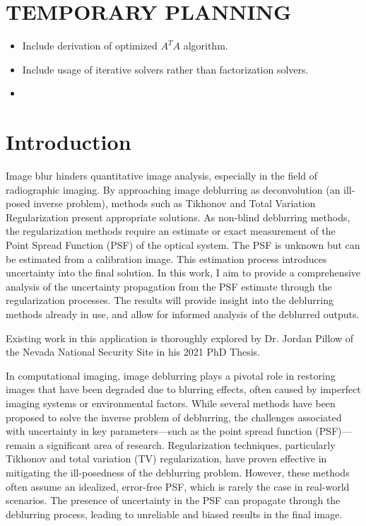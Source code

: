 \documentclass[letterpaper, 10pt, titlepage, twocolumn]{article}
\begin{document}
\section*{TEMPORARY PLANNING}
\begin{itemize}
  \item Include derivation of optimized $A^T A$ algorithm.
  \item Include usage of iterative solvers rather than factorization solvers.
  \item 
\end{itemize}

\section*{Introduction}
Image blur hinders quantitative image analysis, especially in the field of radiographic imaging. By approaching image deblurring as deconvolution (an ill-posed inverse problem), methods such as Tikhonov and Total Variation Regularization present appropriate solutions. As non-blind deblurring methods, the regularization methods require an estimate or exact measurement of the Point Spread Function (PSF) of the optical system. The PSF is unknown but can be estimated from a calibration image. This estimation process introduces uncertainty into the final solution. In this work, I aim to provide a comprehensive analysis of the uncertainty propagation from the PSF estimate through the regularization processes. The results will provide insight into the deblurring methods already in use, and allow for informed analysis of the deblurred outputs.

Existing work in this application is thoroughly explored by Dr. Jordan Pillow of the Nevada National Security Site in his 2021 PhD Thesis. \cite{pillow_bayesian_2021} %


In computational imaging, image deblurring plays a pivotal role in restoring images that have been degraded due to blurring effects, often caused by imperfect imaging systems or environmental factors. While several methods have been proposed to solve the inverse problem of deblurring, the challenges associated with uncertainty in key parameters—such as the point spread function (PSF)—remain a significant area of research. Regularization techniques, particularly Tikhonov and total variation (TV) regularization, have proven effective in mitigating the ill-posedness of the deblurring problem. However, these methods often assume an idealized, error-free PSF, which is rarely the case in real-world scenarios. The presence of uncertainty in the PSF can propagate through the deblurring process, leading to unreliable and biased results in the final image.
\end{document}
